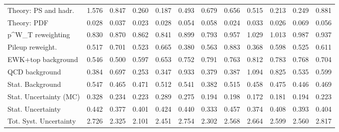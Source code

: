 \begin{tabular}{l|p{0.6cm}p{0.6cm}p{0.6cm}p{0.6cm}p{0.6cm}p{0.6cm}p{0.6cm}p{0.6cm}p{0.6cm}p{0.6cm}p{0.6cm}}
Theory: PS and hadr.                     & 1.576 & 0.847 & 0.260 & 0.187 & 0.493 & 0.679 & 0.656 & 0.515 & 0.213 & 0.249 & 0.881 \\
Theory: PDF                              & 0.028 & 0.037 & 0.023 & 0.028 & 0.054 & 0.058 & 0.024 & 0.033 & 0.026 & 0.069 & 0.056 \\
p^{W}_{T} reweighting                    & 0.830 & 0.870 & 0.862 & 0.841 & 0.899 & 0.793 & 0.957 & 1.029 & 1.013 & 0.987 & 0.937 \\
Pileup reweight.                         & 0.517 & 0.701 & 0.523 & 0.665 & 0.380 & 0.563 & 0.883 & 0.368 & 0.598 & 0.525 & 0.611 \\
EWK+top background                       & 0.546 & 0.500 & 0.597 & 0.653 & 0.752 & 0.791 & 0.763 & 0.812 & 0.783 & 0.768 & 0.704 \\
QCD background                           & 0.384 & 0.697 & 0.253 & 0.347 & 0.933 & 0.379 & 0.387 & 1.094 & 0.825 & 0.535 & 0.599 \\
Stat. Background                         & 0.547 & 0.465 & 0.471 & 0.512 & 0.541 & 0.382 & 0.515 & 0.458 & 0.475 & 0.446 & 0.469 \\
Stat. Uncertainty (MC)                   & 0.328 & 0.234 & 0.223 & 0.289 & 0.275 & 0.194 & 0.198 & 0.172 & 0.181 & 0.194 & 0.223 \\
\hline
Stat. Uncertainty                        & 0.442 & 0.377 & 0.401 & 0.424 & 0.440 & 0.333 & 0.457 & 0.374 & 0.408 & 0.393 & 0.404 \\
\hline
Tot. Syst. Uncertainty                   & 2.726 & 2.325 & 2.101 & 2.451 & 2.754 & 2.302 & 2.568 & 2.664 & 2.599 & 2.560 & 2.817 \\
\hline
\end{tabular}
